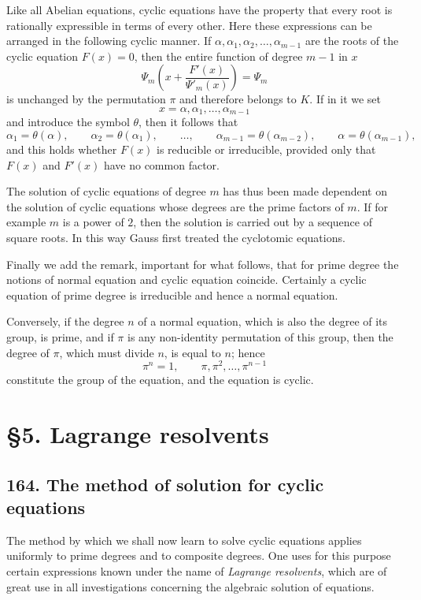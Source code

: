 \documentclass[11pt]{article}
\begin{document}
Like all Abelian equations, cyclic equations have the property that every root is rationally expressible in terms of every other. Here these expressions can be arranged in the following cyclic manner. If $\alpha,\alpha_1,\alpha_2,\dots,\alpha_{m-1}$ are the roots of the cyclic equation $F(x)=0$, then the entire function of degree $m-1$ in $x$
\[
\Psi_m\!\left(x+\frac{F'(x)}{\Psi'_m(x)}\right)=\Psi_m
\]
is unchanged by the permutation $\pi$ and therefore belongs to $K$. If in it we set
\[
x=\alpha,\alpha_1,\dots,\alpha_{m-1}
\]
and introduce the symbol $\theta$, then it follows that
\[
\alpha_1=\theta(\alpha),\qquad
\alpha_2=\theta(\alpha_1),\qquad
\dots,\qquad
\alpha_{m-1}=\theta(\alpha_{m-2}),\qquad
\alpha=\theta(\alpha_{m-1}),
\tag{11}
\]
and this holds whether $F(x)$ is reducible or irreducible, provided only that $F(x)$ and $F'(x)$ have no common factor.

The solution of cyclic equations of degree $m$ has thus been made dependent on the solution of cyclic equations whose degrees are the prime factors of $m$. If for example $m$ is a power of $2$, then the solution is carried out by a sequence of square roots. In this way Gauss first treated the cyclotomic equations.

Finally we add the remark, important for what follows, that for prime degree the notions of normal equation and cyclic equation coincide. Certainly a cyclic equation of prime degree is irreducible and hence a normal equation.

Conversely, if the degree $n$ of a normal equation, which is also the degree of its group, is prime, and if $\pi$ is any non-identity permutation of this group, then the degree of $\pi$, which must divide $n$, is equal to $n$; hence
\[
\pi^n=1,\qquad \pi,\pi^2,\dots,\pi^{n-1}
\]
constitute the group of the equation, and the equation is cyclic.

\section*{\S 5. Lagrange resolvents}

\subsection*{164. The method of solution for cyclic equations}

The method by which we shall now learn to solve cyclic equations applies uniformly to prime degrees and to composite degrees. One uses for this purpose certain expressions known under the name of \emph{Lagrange resolvents}, which are of great use in all investigations concerning the algebraic solution of equations.
\end{document}
